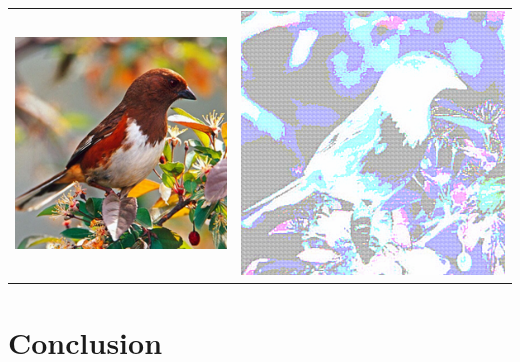 \documentclass[12pt, a4paper]{article}
\begin{document}
\begin{center}
\begin{tabular}{cc}
   \includegraphics[scale=0.5]{Images/oiseau_original.png} &
   \includegraphics[scale=0.5]
   {Images/oiseau_reconstruction.png} \\
\end{tabular}

\end{center}

\section*{Conclusion}
\end{document}
